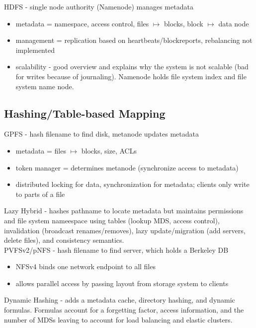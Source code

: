 \documentclass{article}
\begin{document}
\noindent\cite{shvachko:login2012-hdfs-scalability} HDFS - single node authority (Namenode) manages metadata
\begin{itemize}
	\item metadata = namespace, access control, files \(\mapsto\) blocks, block \(\mapsto\) data node
	\item management = replication based on heartbeats/blockreports, rebalancing not implemented
	\item scalability - good overview and explains why the system is not scalable (bad for writes because of journaling). Namenode holds file system index and file system name node.
\end{itemize}

\subsection{Hashing/Table-based Mapping}
\noindent\cite{schmuck:fast2002-gpfs} GPFS - hash filename to find disk, metanode updates metadata
\begin{itemize}
	\item metadata = files \(\mapsto\) blocks, size, ACLs
	\item token manager = determines metanode (synchronize access to metadata)
	\item distributed locking for data, synchronization for metadata; clients only write to parts of a file
\end{itemize}

\noindent\cite{brandt:mss2003-lh} Lazy Hybrid - hashes pathname to locate metadata but maintains permissions and file system nameespace using tables (lookup MDS, access control), invalidation (broadcast renames/removes), lazy update/migration (add servers, delete files), and consistency semantics. \\

\noindent\cite{hildebrand:msst2005-pnfs} PVFSv2/pNFS - hash filename to find server, which holds a Berkeley DB
\begin{itemize}
	\item NFSv4 binds one network endpoint to all files
	\item allows parallel access by passing layout from storage system to clients
\end{itemize}

\noindent\cite{li:msst2006-dynamic} Dynamic Hashing - adds a metadata cache, directory hashing, and dynamic formulas. Formulas account for a forgetting factor, access information, and the number of MDSs leaving to account for load balancing and elastic clusters.\\
\end{document}
